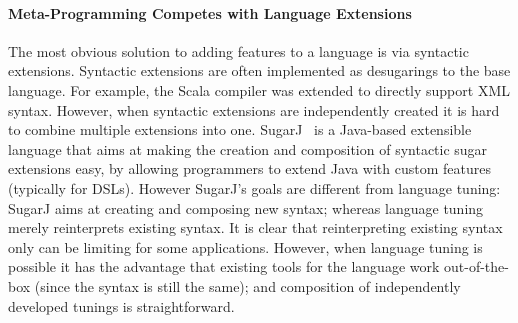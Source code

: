 \begin{comment}
\subsection{Type-Directed Translations/Syntactic Sugar}
\marco{I'm tring to merge this and the next one}
Language extensions are often implemented as syntactic sugar of the base
language. For example, Scala compiler supports XML syntax in normal Scala code
directly (after Scala ?, users need to import \texttt{scala-xml} library
manually). However, this approach is hard in terms of implementation, because it
requires extending the compiler. Also, this approach does not support combining
multiple extensions into one.

SugarJ~\cite{erdweg11sugarj} is a Java-based extensible programming language
that allows programmers to extend the base language with custom language
features by definitions in meta-DSLs (SDF, Stratego, etc).
\yanlin{Is new syntax really a ``drawback''? I think for some system, like
  SugarJ, one of purpose IS to introduce these new syntax.}  Drawbacks: new
syntax. To create the extension, programmers have to work with multiple
languages (SDF, stratego, etc) while our approach works totally in Java
environment.

We can model certain types of language extensions with annotations
only, but those extensions do not introduce new syntax: they
merely do automatic code generation.
\end{comment}

\paragraph{Meta-Programming Competes with Language Extensions}
The most obvious solution to adding features to a language is via syntactic
extensions. Syntactic extensions are often implemented as
desugarings to the base language. For example,
the Scala compiler was extended to directly support XML syntax.
However, when syntactic extensions are independently created it is hard
to combine multiple extensions into one.
SugarJ~\cite{erdweg11sugarj} is a Java-based extensible language that
aims at making the creation and composition of syntactic sugar
extensions easy, by allowing programmers to extend Java with custom
features (typically for DSLs). However SugarJ's goals are different
from language tuning: SugarJ aims at creating and composing new syntax;
whereas language tuning merely reinterprets existing syntax. It is
clear that reinterpreting existing syntax only can be limiting
for some applications. However, when language tuning is possible
it has the advantage that existing tools for the language work
out-of-the-box (since the syntax is still the same); and composition
of independently developed tunings is straightforward.

